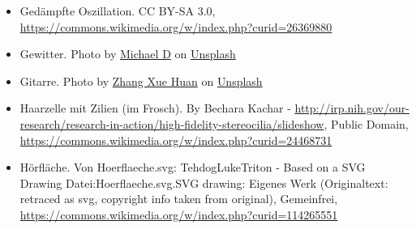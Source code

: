 \documentclass{beamer}
\begin{document}
\begin{frame}
\begin{tiny}
\begin{itemize}
\item
Gedämpfte Oszillation. CC BY-SA 3.0, \url{https://commons.wikimedia.org/w/index.php?curid=26369880}

\item
Gewitter. Photo by \href{https://unsplash.com/@alienaperture?utm_source=unsplash&utm_medium=referral&utm_content=creditCopyText}{Michael D} on \href{https://unsplash.com/s/photos/thunderstorm?utm_source=unsplash&utm_medium=referral&utm_content=creditCopyText}{Unsplash}

\item
Gitarre. Photo by \href{https://unsplash.com/@wooozxh?utm_source=unsplash&utm_medium=referral&utm_content=creditCopyText}{Zhang Xue Huan} on \href{https://unsplash.com/s/photos/tuning-guitar?utm_source=unsplash&utm_medium=referral&utm_content=creditCopyText}{Unsplash}
  
  
\item
Haarzelle mit Zilien (im Frosch). By Bechara Kachar - \url{http://irp.nih.gov/our-research/research-in-action/high-fidelity-stereocilia/slideshow}, Public Domain, \url{https://commons.wikimedia.org/w/index.php?curid=24468731}

\item
Hörfläche. Von Hoerflaeche.svg: TehdogLukeTriton - Based on a SVG Drawing Datei:Hoerflaeche.svg.SVG drawing: Eigenes Werk (Originaltext: retraced as svg, copyright info taken from original), Gemeinfrei, \url{https://commons.wikimedia.org/w/index.php?curid=114265551}

\end{itemize}
\end{tiny}
\end{frame}
\end{document}
